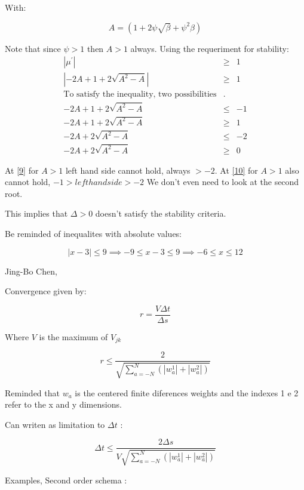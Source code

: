 \documentclass[legalpaper, 12pt]{article}
\begin{document}
With:

\begin{equation}
A = \left(1+2\psi\sqrt{\beta}+\psi^2\beta\right) \label{8}
\end{equation}

Note that since $ \psi > 1 $ then $ A > 1 $ always. Using the requeriment for stability:
\begin{eqnarray}
| \mu^{'} | &\geq& 1 \nonumber \\
	\left|-2 A + 1 + 2\sqrt{A^2-A}\right| &\geq& 1  \nonumber \\
	\text{To satisfy the inequality, two possibilities} &.&\nonumber \\
    -2 A + 1 + 2\sqrt{A^2-A} &\leq& -1  \nonumber \\
	-2 A + 1 + 2\sqrt{A^2-A} &\geq& 1  \nonumber \\ 
	-2 A + 2\sqrt{A^2-A} &\leq& -2  \label{9} \\
    -2 A + 2\sqrt{A^2-A} &\geq& 0  \label{10} 
\end{eqnarray}

At \ref{9} for $ A > 1 $ left hand side cannot hold, always $ > -2 $. 
At \ref{10} for $ A > 1 $ also cannot hold, $ -1 > left hand side > -2 $
We don't even need to look at the second root. 


This implies that $ \Delta > 0 $ doesn't satisfy the stability criteria. 

\newpage

Be reminded of inequalites with absolute values:

$$ |x-3| \leq 9 \implies -9 \leq x - 3 \leq 9 \implies  -6 \leq x \leq 12 $$

\newpage

Jing-Bo Chen, \\
\bigskip

Convergence given by:

$$ r = \frac{V \Delta t}{\Delta s} $$ 

Where $ V $ is the maximum of $ V_{jk} $ 

$$ r \leq \frac{2}{\sqrt{\sum_{a=-N}^{N} (|w_a^1| + |w_a^2|)}} $$

Reminded that $w_a$ is the centered finite diferences weights and the indexes 1 e 2 refer to the x and y dimensions.

Can writen as limitation to $ \Delta t $ :

$$ \Delta t \leq \frac{2 \Delta s}{ V \sqrt{\sum_{a=-N}^{N} (|w_a^1| + |w_a^2|)}} $$

Examples, 
Second order schema :
\end{document}
